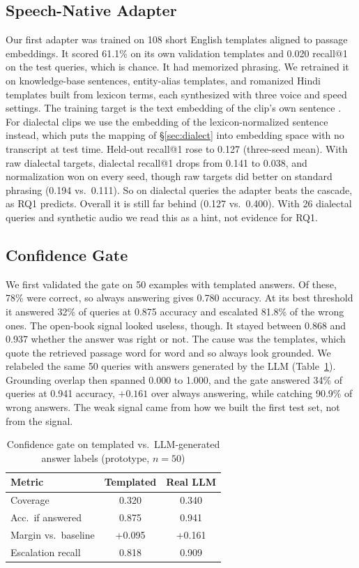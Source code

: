 \documentclass[conference]{IEEEtran}
\begin{document}
\subsection{Speech-Native Adapter}
Our first adapter was trained on 108 short English templates aligned to passage embeddings. It scored 61.1\% on its own validation templates and 0.020 recall@1 on the test queries, which is chance. It had memorized phrasing. We retrained it on knowledge-base sentences, entity-alias templates, and romanized Hindi templates built from lexicon terms, each synthesized with three voice and speed settings. The training target is the text embedding of the clip's own sentence \cite{min2025speechrag}. For dialectal clips we use the embedding of the lexicon-normalized sentence instead, which puts the mapping of \S\ref{sec:dialect} into embedding space with no transcript at test time. Held-out recall@1 rose to 0.127 (three-seed mean). With raw dialectal targets, dialectal recall@1 drops from 0.141 to 0.038, and normalization won on every seed, though raw targets did better on standard phrasing (0.194 vs.\ 0.111). So on dialectal queries the adapter beats the cascade, as RQ1 predicts. Overall it is still far behind (0.127 vs.\ 0.400). With 26 dialectal queries and synthetic audio we read this as a hint, not evidence for RQ1.

\subsection{Confidence Gate}
We first validated the gate on 50 examples with templated answers. Of these, 78\% were correct, so always answering gives 0.780 accuracy. At its best threshold it answered 32\% of queries at 0.875 accuracy and escalated 81.8\% of the wrong ones. The open-book signal looked useless, though. It stayed between 0.868 and 0.937 whether the answer was right or not. The cause was the templates, which quote the retrieved passage word for word and so always look grounded. We relabeled the same 50 queries with answers generated by the LLM (Table~\ref{tab:gate}). Grounding overlap then spanned 0.000 to 1.000, and the gate answered 34\% of queries at 0.941 accuracy, $+0.161$ over always answering, while catching 90.9\% of wrong answers. The weak signal came from how we built the first test set, not from the signal.

\begin{table}[t]
\caption{Confidence gate on templated vs.\ LLM-generated answer labels (prototype, $n{=}50$)}
\centering
\footnotesize
\begin{tabular}{@{}lcc@{}}
\toprule
\textbf{Metric} & \textbf{Templated} & \textbf{Real LLM} \\
\midrule
Coverage             & 0.320        & 0.340 \\
Acc.\ if answered    & 0.875        & 0.941 \\
Margin vs.\ baseline & +0.095       & +0.161 \\
Escalation recall    & 0.818        & 0.909 \\
\bottomrule
\end{tabular}
\label{tab:gate}
\end{table}
\end{document}
